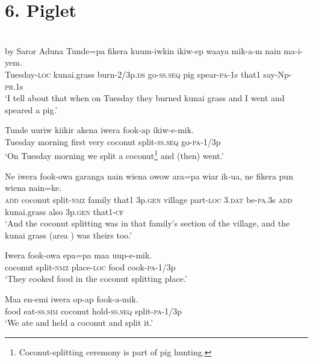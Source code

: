 {\section{6. Piglet} \\

 by Saror Aduna
\ea\label{ex:a:x1}
\gll  Tunde=pa  fikera  kuum-iwkin  ikiw-ep  waaya      mik-a-m  nain  ma-i-yem. \\
Tuesday-\textsc{loc}  kunai.grass  burn-2/3p.\textsc{ds}  go-\textsc{ss.seq}  pig  spear-\textsc{pa}-1s  that1  say-Np-\textsc{pr}.1s \\


\glt ‘I tell about that when on Tuesday they burned kunai grass and I went and speared a pig.’ \\
\z


\ea\label{ex:a:x2}
\gll  Tunde  uuriw  kiikir  akena  iwera  fook-ap  ikiw-e-mik. \\
Tuesday  morning  first  very  coconut  split-\textsc{ss.seq}  go-\textsc{pa}-1/3p \\
\glt ‘On Tuesday morning we split a coconut\footnote{ Coconut-splitting ceremony is part of pig hunting.} and (then) went.’ \\
\z


\ea\label{ex:a:x3}
\gll  Ne  iwera  fook-owa  garanga  nain  wiena  owow  ara=pa      wiar  ik-ua,  ne  fikera  pun  wiena  nain=ke. \\
\textsc{add}  coconut  split-\textsc{nmz}  family  that1  3p.\textsc{gen}  village  part-\textsc{loc}  3.\textsc{dat}  be-\textsc{pa}.3s  \textsc{add}  kunai.grass  also  3p.\textsc{gen}  that1-\textsc{cf} \\


\glt ‘And the coconut splitting was in that family’s section of the village, and the kunai grass (area ) was theirs too.’ \\
\z


\ea\label{ex:a:x4}
\gll  Iwera  fook-owa  epa=pa  maa  uup-e-mik. \\
coconut  split-\textsc{nmz}  place-\textsc{loc}  food  cook-\textsc{pa}-1/3p \\
\glt ‘They cooked food in the coconut splitting place.’ \\
\z


\ea\label{ex:a:x5}
\gll  Maa  en-emi  iwera  op-ap  fook-a-mik. \\
food  eat-\textsc{ss}.\textsc{sim}  coconut  hold-\textsc{ss.seq}  split-\textsc{pa}-1/3p \\
\glt ‘We ate and held a coconut and split it.’ \\
\z


}
